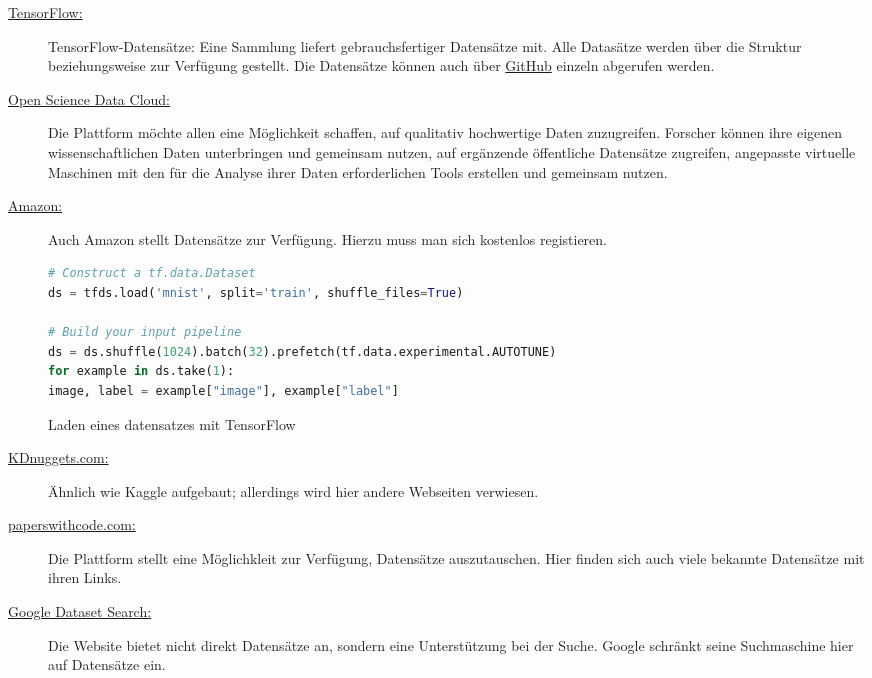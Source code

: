{\begin{description}
  \item [\href{}{TensorFlow:}] TensorFlow-Datensätze: Eine Sammlung liefert gebrauchsfertiger Datensätze mit. Alle Datasätze werden über die Struktur  beziehungsweise   zur Verfügung gestellt. Die Datensätze können auch über \href{https://github.com/tensorflow/datasets/tree/master/tensorflow_datasets}{GitHub} einzeln abgerufen werden. 

  \item [\href{https://www.opensciencedatacloud.org}{Open Science Data Cloud:}] Die Plattform möchte allen eine Möglichkeit schaffen, auf qualitativ hochwertige Daten zuzugreifen. Forscher können ihre eigenen wissenschaftlichen Daten unterbringen und gemeinsam nutzen, auf ergänzende öffentliche Datensätze zugreifen, angepasste virtuelle Maschinen mit den für die Analyse ihrer Daten erforderlichen Tools erstellen und gemeinsam nutzen.
  
  \item[\href{http://aws.amazon.com/de/datasets/}{Amazon:}] Auch Amazon stellt Datensätze zur Verfügung. Hierzu muss man sich kostenlos registieren.
  
  \begin{code}
    \begin{lstlisting}[language=python]
# Construct a tf.data.Dataset
ds = tfds.load('mnist', split='train', shuffle_files=True)

# Build your input pipeline
ds = ds.shuffle(1024).batch(32).prefetch(tf.data.experimental.AUTOTUNE)
for example in ds.take(1):
image, label = example["image"], example["label"]
    \end{lstlisting}
    \caption{Laden eines datensatzes mit TensorFlow}
  \end{code}


  \item [\href{https://www.kdnuggets.com/datasets}{KDnuggets.com:}] Ähnlich wie Kaggle aufgebaut; allerdings wird hier andere Webseiten verwiesen.
  \item [\href{https://paperswithcode.com/datasetss}{paperswithcode.com:}] Die Plattform stellt eine Möglichkleit zur Verfügung, Datensätze auszutauschen. Hier finden sich auch viele bekannte Datensätze mit ihren Links.
  \item [\href{https://datasetsearch.research.google.com}{Google Dataset Search:}] Die Website bietet nicht direkt Datensätze an, sondern eine Unterstützung bei der Suche. Google schränkt seine Suchmaschine hier auf Datensätze ein.


\end{description}}
